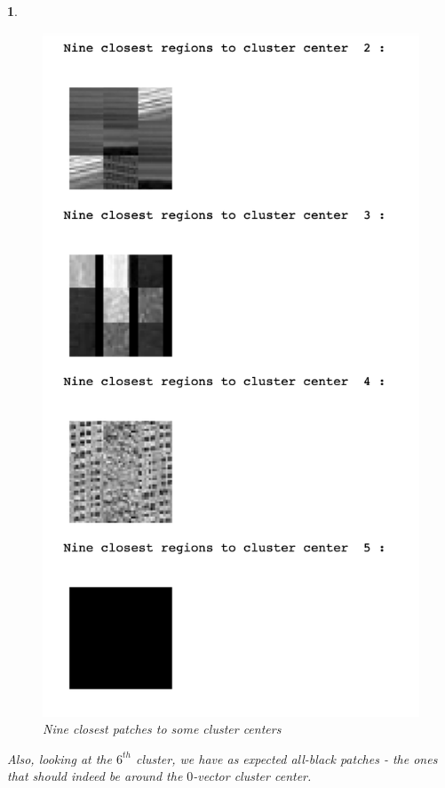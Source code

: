 \documentclass[10pt]{article} %
\theoremstyle{question-style}
\newtheorem{answer}{\arabic{answer}}
\begin{document}
\begin{flushleft}
\begin{answer}
\begin{figure}[H]
	\begin{center}
		\includegraphics[scale=0.6]{clusters.png} %
	\end{center}
	\caption{Nine closest patches to some cluster centers}
	\label{fig:clusters}
\end{figure}

\quad Also, looking at the $6^{th}$ cluster, we have as expected all-black patches - the ones that should indeed be around the $0$-vector cluster center. 
\end{answer}


\end{flushleft}
\end{document}

